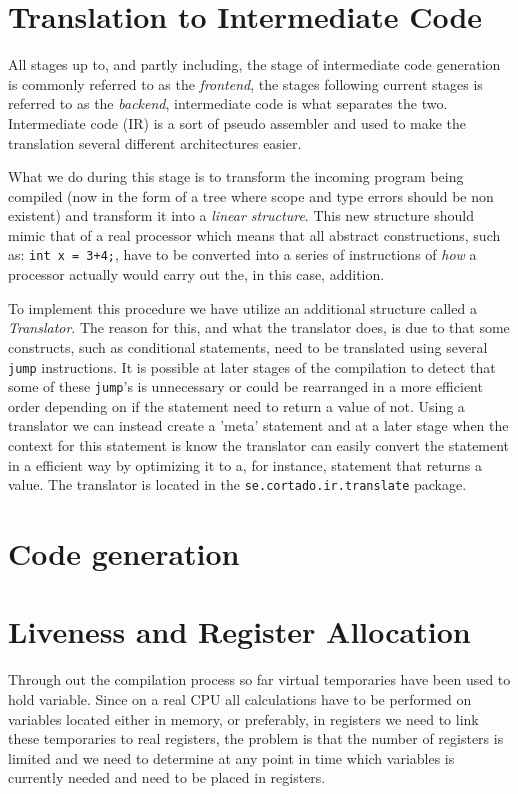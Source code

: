 \documentclass[11pt]{amsart}
\begin{document}
\section{Translation to Intermediate Code}
All stages up to, and partly including, the stage of intermediate code generation is commonly referred to as the \textit{frontend}, the stages following current stages is referred to as the \textit{backend}, intermediate code is what separates the two. Intermediate code (IR) is a sort of pseudo assembler and used to make the translation several different architectures easier. 

What we do during this stage is to transform the incoming program being compiled (now in the form of a tree where scope and type errors should be non existent) and transform it into a \textit{linear structure}. This new structure should mimic that of a real processor which means that all abstract constructions, such as: \texttt{int x = 3+4;}, have to be converted into a series of instructions of \textit{how} a processor actually would carry out the, in this case, addition.

To implement this procedure we have utilize an additional structure called a \textit{Translator}. The reason for this, and what the translator does, is due to that some constructs, such as conditional statements, need to be translated using several \texttt{jump} instructions. It is possible at later stages of the compilation to detect that some of these \texttt{jump}'s is unnecessary or could be rearranged in a more efficient order depending on if the statement need to return a value of not. Using a translator we can instead create a 'meta' statement and at a later stage when the context for this statement is know the translator can easily convert the statement in a efficient way by optimizing it to a, for instance, statement that returns a value. The translator is located in the \texttt{se.cortado.ir.translate} package.

\section{Code generation}


\section{Liveness and Register Allocation}
Through out the compilation process so far virtual temporaries have been used to hold variable. Since on a real CPU all calculations have to be performed on variables located either in memory, or preferably, in registers we need to link these temporaries to real registers, the problem is that the number of registers is limited and we need to determine at any point in time which variables is currently needed and need to be placed in registers.
\end{document}
